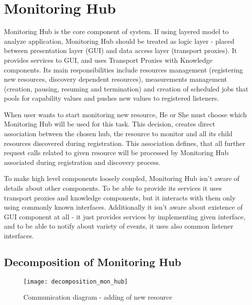%
\section{Monitoring Hub}
\label{sec:arch_monitoring_hub}

Monitoring Hub is the core component of system. If using layered model to analyze application, Monitoring Hub should be treated as logic layer - placed between presentation layer (GUI) and data access layer (transport proxies). It provides services to GUI, and uses Transport Proxies with Knowledge components. Its main responsibilities include resources management (registering new resources, discovery dependent resources), measurements management (creation, pausing, resuming and termination) and creation of scheduled jobs that pools for capability values and pushes new values to registered listeners. 

When user wants to start monitoring new resource, He or She must choose which Monitoring Hub will be used for this task. This decision, creates direct association between the chosen hub, the resource to monitor and all its child resources discovered during registration. This association defines, that all further request calls related to given resource will be processed by Monitoring Hub associated during registration and discovery process.

To make high level components loosely coupled, Monitoring Hub isn't aware of details about other components. To be able to provide its services it uses transport proxies and knowledge components, but it interacts with them only using commonly known interfaces. Additionally it isn't aware about existence of GUI component at all - it just provides services by implementing given interface, and to be able to notify about variety of events, it uses also common listener interfaces.


\subsection{Decomposition of Monitoring Hub}

\begin{figure}[ht]
\centering
\texttt{[image: decomposition\_mon\_hub]}
\caption{Communication diagram - adding of new resource}
\label{fig:decomposition_mon_hub}
\end{figure}

